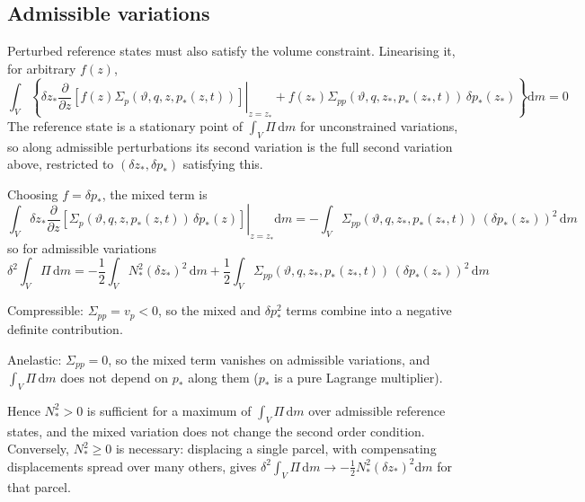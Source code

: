 \documentclass{article}
\begin{document}
\subsection{Admissible variations}
Perturbed reference states must also satisfy the volume constraint.
Linearising it, for arbitrary \(f(z)\),
\begin{equation}
    \int_V
    \left\{
        \delta z_*
        \left.
        \frac{\partial}{\partial z}
        \left[
            f(z) \Sigma_p(\vartheta, q, z, p_*(z, t))
        \right]
        \right|_{z = z_*}
        + f(z_*) \Sigma_{pp}(\vartheta, q, z_*, p_*(z_*, t)) \, \delta p_*(z_*)
    \right\}
    \mathrm{d}m
    = 0
\end{equation}
The reference state is a stationary point of \(\int_V \Pi \, \mathrm{d}m\) for unconstrained variations, so along admissible perturbations its second variation is the full second variation above, restricted to \((\delta z_*, \delta p_*)\) satisfying this.

Choosing \(f = \delta p_*\), the mixed term is
\begin{equation}
    \int_V
    \delta z_*
    \left.
    \frac{\partial}{\partial z}
    \left[
        \Sigma_p(\vartheta, q, z, p_*(z, t)) \, \delta p_*(z)
    \right]
    \right|_{z = z_*}
    \mathrm{d}m
    =
    - \int_V \Sigma_{pp}(\vartheta, q, z_*, p_*(z_*, t)) \, (\delta p_*(z_*))^2 \, \mathrm{d}m
\end{equation}
so for admissible variations
\begin{equation}
    \delta^2 \int_V \Pi \, \mathrm{d}m
    =
    - \frac{1}{2} \int_V N_*^2 (\delta z_*)^2 \, \mathrm{d}m
    + \frac{1}{2} \int_V \Sigma_{pp}(\vartheta, q, z_*, p_*(z_*, t)) \, (\delta p_*(z_*))^2 \, \mathrm{d}m
\end{equation}

Compressible: \(\Sigma_{pp} = v_p < 0\), so the mixed and \(\delta p_*^2\) terms combine into a negative definite contribution.

Anelastic: \(\Sigma_{pp} = 0\), so the mixed term vanishes on admissible variations, and \(\int_V \Pi \, \mathrm{d}m\) does not depend on \(p_*\) along them (\(p_*\) is a pure Lagrange multiplier).

Hence \(N_*^2 > 0\) is sufficient for a maximum of \(\int_V \Pi \, \mathrm{d}m\) over admissible reference states, and the mixed variation does not change the second order condition.
Conversely, \(N_*^2 \geq 0\) is necessary: displacing a single parcel, with compensating displacements spread over many others, gives \(\delta^2 \int_V \Pi \, \mathrm{d}m \to - \frac{1}{2} N_*^2 (\delta z_*)^2 \mathrm{d}m\) for that parcel.
\end{document}

